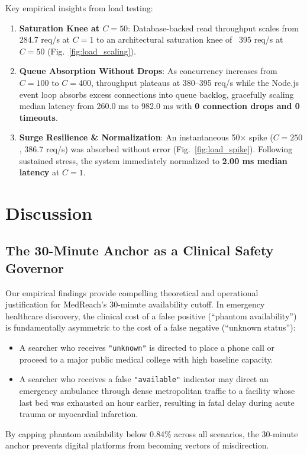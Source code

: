 \documentclass[conference]{IEEEtran}
\begin{document}
Key empirical insights from load testing:
\begin{enumerate}
    \item \textbf{Saturation Knee at $C=50$}: Database-backed read throughput scales from 284.7 req/s at $C=1$ to an architectural saturation knee of ~395 req/s at $C=50$ (Fig.~\ref{fig:load_scaling}).
    \item \textbf{Queue Absorption Without Drops}: As concurrency increases from $C=100$ to $C=400$, throughput plateaus at 380--395 req/s while the Node.js event loop absorbs excess connections into queue backlog, gracefully scaling median latency from 260.0 ms to 982.0 ms with \textbf{0 connection drops and 0 timeouts}.
    \item \textbf{Surge Resilience \& Normalization}: An instantaneous 50$\times$ spike ($C=250$, 386.7 req/s) was absorbed without error (Fig.~\ref{fig:load_spike}). Following sustained stress, the system immediately normalized to \textbf{2.00 ms median latency} at $C=1$.
\end{enumerate}

\section{Discussion}

\subsection{The 30-Minute Anchor as a Clinical Safety Governor}
Our empirical findings provide compelling theoretical and operational justification for MedReach's 30-minute availability cutoff. In emergency healthcare discovery, the clinical cost of a false positive (``phantom availability'') is fundamentally asymmetric to the cost of a false negative (``unknown status''):
\begin{itemize}
    \item A searcher who receives \texttt{"unknown"} is directed to place a phone call or proceed to a major public medical college with high baseline capacity.
    \item A searcher who receives a false \texttt{"available"} indicator may direct an emergency ambulance through dense metropolitan traffic to a facility whose last bed was exhausted an hour earlier, resulting in fatal delay during acute trauma or myocardial infarction.
\end{itemize}
By capping phantom availability below 0.84\% across all scenarios, the 30-minute anchor prevents digital platforms from becoming vectors of misdirection.
\end{document}
